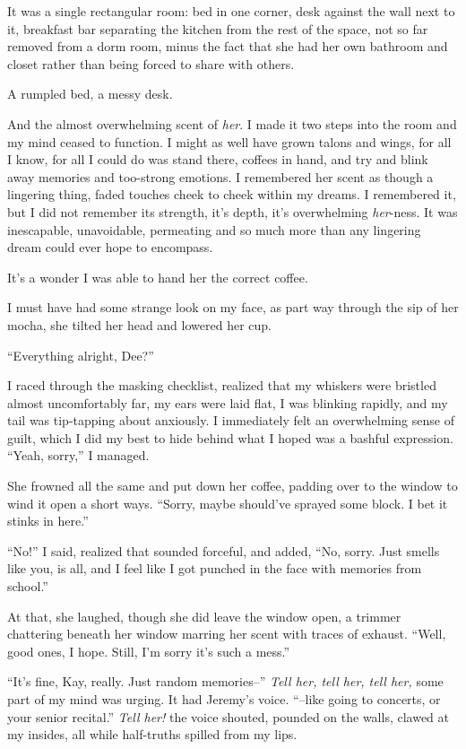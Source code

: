 It was a single rectangular room: bed in one corner, desk against the wall next to it, breakfast bar separating the kitchen from the rest of the space, not so far removed from a dorm room, minus the fact that she had her own bathroom and closet rather than being forced to share with others.

A rumpled bed, a messy desk.

And the almost overwhelming scent of \emph{her}. I made it two steps into the room and my mind ceased to function. I might as well have grown talons and wings, for all I know, for all I could do was stand there, coffees in hand, and try and blink away memories and too-strong emotions. I remembered her scent as though a lingering thing, faded touches cheek to cheek within my dreams. I remembered it, but I did not remember its strength, it's depth, it's overwhelming \emph{her}-ness. It was inescapable, unavoidable, permeating and so much more than any lingering dream could ever hope to encompass.

It's a wonder I was able to hand her the correct coffee.

I must have had some strange look on my face, as part way through the sip of her mocha, she tilted her head and lowered her cup.

``Everything alright, Dee?''

I raced through the masking checklist, realized that my whiskers were bristled almost uncomfortably far, my ears were laid flat, I was blinking rapidly, and my tail was tip-tapping about anxiously. I immediately felt an overwhelming sense of guilt, which I did my best to hide behind what I hoped was a bashful expression. ``Yeah, sorry,'' I managed.

She frowned all the same and put down her coffee, padding over to the window to wind it open a short ways. ``Sorry, maybe should've sprayed some block. I bet it stinks in here.''

``No!'' I said, realized that sounded forceful, and added, ``No, sorry. Just smells like you, is all, and I feel like I got punched in the face with memories from school.''

At that, she laughed, though she did leave the window open, a trimmer chattering beneath her window marring her scent with traces of exhaust. ``Well, good ones, I hope. Still, I'm sorry it's such a mess.''

``It's fine, Kay, really. Just random memories--'' \emph{Tell her, tell her, tell her,} some part of my mind was urging. It had Jeremy's voice. ``--like going to concerts, or your senior recital.'' \emph{Tell her!} the voice shouted, pounded on the walls, clawed at my insides, all while half-truths spilled from my lips.

